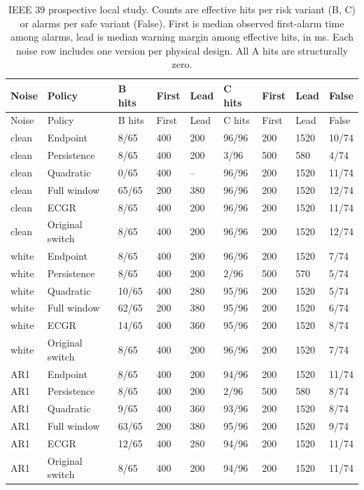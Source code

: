 \documentclass[10pt]{article}
\begin{document}
\begin{longtable}{@{}lllllllll@{}}
\caption{IEEE 39 prospective local study. Counts are effective hits per risk variant (B, C) or alarms per safe variant (False). First is median observed first-alarm time among alarms, lead is median warning margin among effective hits, in ms. Each noise row includes one version per physical design. All A hits are structurally zero.}\label{tab:absieee39}\\
\toprule Noise & Policy & B hits & First & Lead & C hits & First & Lead & False \\\midrule\endfirsthead
\toprule Noise & Policy & B hits & First & Lead & C hits & First & Lead & False \\\midrule\endhead
clean & Endpoint & 8/65 & 400 & 200 & 96/96 & 200 & 1520 & 10/74 \\
clean & Persistence & 8/65 & 400 & 200 & 3/96 & 500 & 580 & 4/74 \\
clean & Quadratic & 0/65 & 400 & -- & 96/96 & 200 & 1520 & 11/74 \\
clean & Full window & 65/65 & 200 & 380 & 96/96 & 200 & 1520 & 12/74 \\
clean & ECGR & 8/65 & 400 & 200 & 96/96 & 200 & 1520 & 11/74 \\
clean & Original switch & 8/65 & 400 & 200 & 96/96 & 200 & 1520 & 12/74 \\
white & Endpoint & 8/65 & 400 & 200 & 96/96 & 200 & 1520 & 7/74 \\
white & Persistence & 8/65 & 400 & 200 & 2/96 & 500 & 570 & 5/74 \\
white & Quadratic & 10/65 & 400 & 280 & 95/96 & 200 & 1520 & 5/74 \\
white & Full window & 62/65 & 200 & 380 & 95/96 & 200 & 1520 & 6/74 \\
white & ECGR & 14/65 & 400 & 360 & 95/96 & 200 & 1520 & 8/74 \\
white & Original switch & 8/65 & 400 & 200 & 96/96 & 200 & 1520 & 7/74 \\
AR1 & Endpoint & 8/65 & 400 & 200 & 94/96 & 200 & 1520 & 11/74 \\
AR1 & Persistence & 8/65 & 400 & 200 & 2/96 & 500 & 580 & 8/74 \\
AR1 & Quadratic & 9/65 & 400 & 360 & 93/96 & 200 & 1520 & 8/74 \\
AR1 & Full window & 63/65 & 200 & 380 & 95/96 & 200 & 1520 & 9/74 \\
AR1 & ECGR & 12/65 & 400 & 280 & 94/96 & 200 & 1520 & 11/74 \\
AR1 & Original switch & 8/65 & 400 & 200 & 94/96 & 200 & 1520 & 11/74 \\
\bottomrule\end{longtable}\endgroup\begingroup\footnotesize\setlength{\tabcolsep}{4pt}
\end{document}
